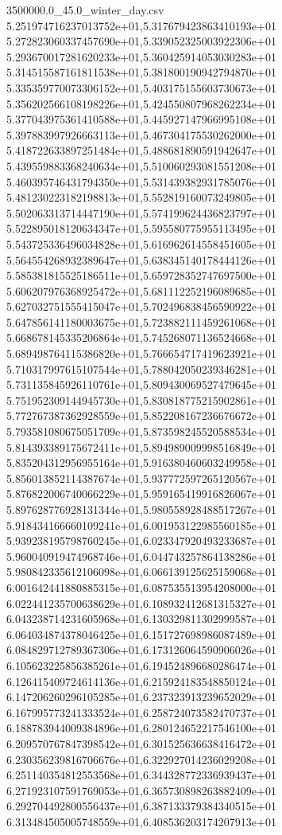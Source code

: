 \begin{filecontents*}{3500000.0_45.0_winter_day.csv}
5.251974716237013752e+01,5.317679423863410193e+01
5.272823060337457690e+01,5.339052325003922306e+01
5.293670017281620233e+01,5.360425914053030283e+01
5.314515587161811538e+01,5.381800190942794870e+01
5.335359770073306152e+01,5.403175155603730673e+01
5.356202566108198226e+01,5.424550807968262234e+01
5.377043975361410588e+01,5.445927147966995108e+01
5.397883997926663113e+01,5.467304175530262000e+01
5.418722633897251484e+01,5.488681890591942647e+01
5.439559883368240634e+01,5.510060293081551208e+01
5.460395746431794350e+01,5.531439382931785076e+01
5.481230223182198813e+01,5.552819160073249805e+01
5.502063313714447190e+01,5.574199624436823797e+01
5.522895018120634347e+01,5.595580775955113495e+01
5.543725336496034828e+01,5.616962614558451605e+01
5.564554268932389647e+01,5.638345140178444126e+01
5.585381815525186511e+01,5.659728352747697500e+01
5.606207976368925472e+01,5.681112252196089685e+01
5.627032751555415047e+01,5.702496838456590922e+01
5.647856141180003675e+01,5.723882111459261068e+01
5.668678145335206864e+01,5.745268071136524668e+01
5.689498764115386820e+01,5.766654717419623921e+01
5.710317997615107544e+01,5.788042050239346281e+01
5.731135845926110761e+01,5.809430069527479645e+01
5.751952309144945730e+01,5.830818775215902861e+01
5.772767387362928559e+01,5.852208167236676672e+01
5.793581080675051709e+01,5.873598245520588534e+01
5.814393389175672411e+01,5.894989009998516849e+01
5.835204312956955164e+01,5.916380460603249958e+01
5.856013852114387674e+01,5.937772597265120567e+01
5.876822006740066229e+01,5.959165419916826067e+01
5.897628776928131344e+01,5.980558928488517267e+01
5.918434166660109241e+01,6.001953122985560185e+01
5.939238195798760245e+01,6.023347920493233687e+01
5.960040919474968746e+01,6.044743257864138286e+01
5.980842335612106098e+01,6.066139125625159068e+01
6.001642441880885315e+01,6.087535513954208000e+01
6.022441235700638629e+01,6.108932412681315327e+01
6.043238714231605968e+01,6.130329811302999587e+01
6.064034874378046425e+01,6.151727698986087489e+01
6.084829712789367306e+01,6.173126064590906026e+01
6.105623225856385261e+01,6.194524896680286474e+01
6.126415409724614136e+01,6.215924183548850124e+01
6.147206260296105285e+01,6.237323913239652029e+01
6.167995773241333524e+01,6.258724073582470737e+01
6.188783944009384896e+01,6.280124652217546100e+01
6.209570767847398542e+01,6.301525636638416472e+01
6.230356239816706676e+01,6.322927014236029208e+01
6.251140354812553568e+01,6.344328772336939437e+01
6.271923107591769053e+01,6.365730898263882409e+01
6.292704492800556437e+01,6.387133379384340515e+01
6.313484505005748559e+01,6.408536203174207913e+01

\end{filecontents*}
